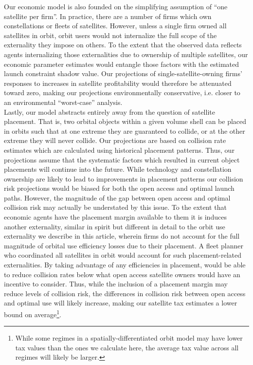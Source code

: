 \documentclass[12pt]{article}
\begin{document}
Our economic model is also founded on the simplifying assumption of ``one satellite per firm''. In practice, there are a number of firms which own constellations or fleets of satellites. However, unless a single firm owned all satellites in orbit, orbit users would not internalize the full scope of the externality they impose on others. To the extent that the observed data reflects agents internalizing those externalities due to ownership of multiple satellites, our economic parameter estimates would entangle those factors with the estimated launch constraint shadow value. Our projections of single-satellite-owning firms' responses to increases in satellite profitability would therefore be attenuated toward zero, making our projections environmentally conservative, i.e. closer to an environmental ``worst-case'' analysis. \\

Lastly, our model abstracts entirely away from the question of satellite placement. That is, two orbital objects within a given volume shell can be placed in orbits such that at one extreme they are guaranteed to collide, or at the other extreme they will never collide. Our projections are based on collision rate estimates which are calculated using historical placement patterns. Thus, our projections assume that the systematic factors which resulted in current object placements will continue into the future. While technology and constellation ownership are likely to lead to improvements in placement patterns our collision risk projections would be biased for both the open access and optimal launch paths. However, the magnitude of the gap between open access and optimal collision risk may actually be understated by this issue. To the extent that economic agents have the placement margin available to them it is induces another externality, similar in spirit but different in detail to the orbit use externality we describe in this article, wherein firms do not account for the full magnitude of orbital use efficiency losses due to their placement. A fleet planner who coordinated all satellites in orbit would account for such placement-related externalities. By taking advantage of any efficiencies in placement, would be able to reduce collision rates below what open access satellite owners would have an incentive to consider. Thus, while the inclusion of a placement margin may reduce levels of collision risk, the differences in collision risk between open access and optimal use will likely increase, making our satellite tax estimates a lower bound on average\footnote{While some regimes in a spatially-differentiated orbit model may have lower tax values than the ones we calculate here, the average tax value across all regimes will likely be larger.}.
\end{document}
